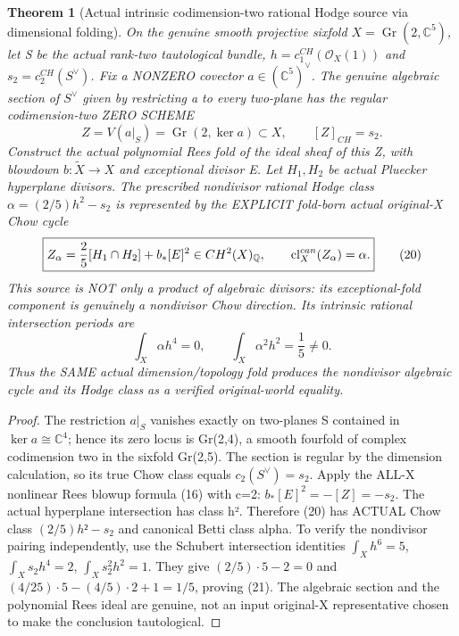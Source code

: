 \documentclass[11pt]{article}
\newtheorem{theorem}{Theorem}[section]
\begin{document}
\begin{theorem}[Actual intrinsic codimension-two rational Hodge source via dimensional folding]
On the genuine smooth projective sixfold
$X=\operatorname{Gr}(2,\mathbb C^5)$, let S be
the actual rank-two tautological bundle,
$h=c_1^{CH}(\mathcal O_X(1))$ and
$s_2=c_2^{CH}(S^\vee)$.
Fix a NONZERO covector
$a\in(\mathbb C^5)^\vee$.
The genuine algebraic section of $S^\vee$
given by restricting a to every two-plane
has the regular codimension-two ZERO SCHEME
\[
 \boxed{
 Z=V(a|_S)=
 \operatorname{Gr}(2,\ker a)\subset X,\qquad
 [Z]_{CH}=s_2.
 }                                                       \tag{19}
\]
Construct the actual polynomial Rees fold
of the ideal sheaf of this Z,
with blowdown $b:\widetilde X\to X$
and exceptional divisor E.
Let $H_1,H_2$ be actual Pluecker hyperplane
divisors. The prescribed nondivisor
rational Hodge class
$\alpha=(2/5)h^2-s_2$
is represented by the EXPLICIT
fold-born actual original-X Chow cycle
\[
 \boxed{
 Z_\alpha={2\over5}[H_1\cap H_2]
                  +b_*[E]^2
 \in CH^2(X)_{\mathbb Q},
 \qquad
 \mathrm{cl}^{can}_X(Z_\alpha)=\alpha .
 }                                                       \tag{20}
\]
This source is NOT only a product of algebraic
divisors: its exceptional-fold component is
genuinely a nondivisor Chow direction.
Its intrinsic rational intersection periods are
\[
 \boxed{
 \int_X\alpha h^4=0,\qquad
 \int_X\alpha^2 h^2=\frac15\ne0.
 }                                                       \tag{21}
\]
Thus the SAME actual dimension/topology fold produces
the nondivisor algebraic cycle and its Hodge class
as a verified original-world equality.
\end{theorem}
\begin{proof}
The restriction $a|_S$ vanishes exactly on
two-planes S contained in $\ker a\cong\mathbb C^4$;
hence its zero locus is Gr(2,4), a smooth
fourfold of complex codimension two in the
sixfold Gr(2,5). The section is regular by
the dimension calculation, so its true Chow
class equals $c_2(S^\vee)=s_2$.
Apply the ALL-X nonlinear Rees blowup formula (16)
with c=2: $b_*[E]^2=-[Z]=-s_2$.
The actual hyperplane intersection has class h².
Therefore (20) has ACTUAL Chow class
$(2/5)h²-s_2$ and canonical Betti class alpha.
To verify the nondivisor pairing independently,
use the Schubert intersection identities
$\int_Xh^6=5$,
$\int_Xs_2h^4=2$,
$\int_Xs_2^2h^2=1$.
They give $(2/5)\cdot5-2=0$ and
$(4/25)\cdot5-(4/5)\cdot2+1=1/5$,
proving (21). The algebraic section and
the polynomial Rees ideal are genuine,
not an input original-X representative
chosen to make the conclusion tautological.
\end{proof}
\end{document}
